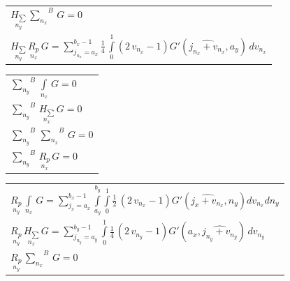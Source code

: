 \documentclass[twoside, 10pt]{article}
\begin{document}
\begin{multicols}{2}
\begin{center}
\begin{tabular}{ l }
$\underset{n_y}{H_{\sum}}\,{\sum\limits_{n_x}^{}}^{B}\,G = 0$ \\

$\underset{n_y}{H_{\sum}}\,\underset{n_x}{R_{p}}\,G = {\sum\limits_{j_{n_{x}}=a_{x}}^{b_{x} - 1} \frac{1}{4} \, \int\limits_{0}^{1} \left(2 \, v_{n_{x}} - 1 \right) G'\left(\widehat{j_{n_{x}} + v_{n_{x}}}, a_{y}\right)\,{d v_{n_{x}}} }$ \\


\end{tabular}
\end{center}

    \begin{center}
\begin{tabular}{ l }


${\sum\limits_{n_y}^{}}^{B}\,\int\limits_{n_x}^{}\,G = 0$ \\

${\sum\limits_{n_y}^{}}^{B}\,\underset{n_x}{H_{\sum}}\,G = 0$ \\

${\sum\limits_{n_y}^{}}^{B}\,{\sum\limits_{n_x}^{}}^{B}\,G = 0$ \\

${\sum\limits_{n_y}^{}}^{B}\,\underset{n_x}{R_{p}}\,G = 0$ \\


\end{tabular}
\end{center}

    \begin{center}
\begin{tabular}{ l }


$\underset{n_y}{R_{p}}\,\int\limits_{n_x}^{}\,G = {\sum\limits_{j_{x}=a_{x}}^{b_{x} - 1} \int\limits_{a_{y}}^{b_{y}} \int\limits_{0}^{1} \frac{1}{2} \, {\left(2 \, v_{n_{x}} - 1\right)} G'\left(\widehat{j_{x} + v_{n_{x}}}, n_{y}\right){d v_{n_{x}}}{d n_{y}}}$ \\

$\underset{n_y}{R_{p}}\,\underset{n_x}{H_{\sum}}\,G = {\sum\limits_{j_{n_{y}}=a_{y}}^{b_{y} - 1} \int\limits_{0}^{1} \frac{1}{4} \, {\left(2 \, v_{n_{y}} - 1\right)} G'\left(a_{x}, \widehat{j_{n_{y}} + v_{n_{y}}}\right)\,{d v_{n_{y}}}}$ \\

$\underset{n_y}{R_{p}}\,{\sum\limits_{n_x}^{}}^{B}\,G = 0$ \\


\end{tabular}
\end{center}
\end{multicols}
\end{document}
